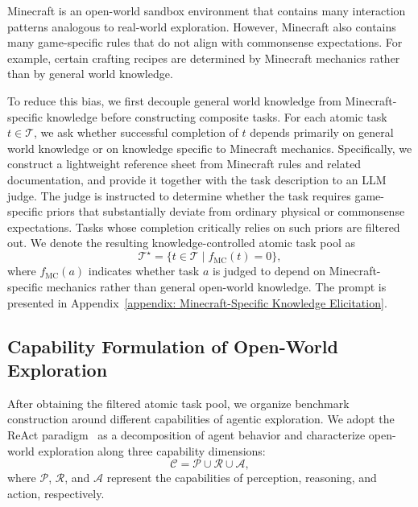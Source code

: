 \documentclass[11pt]{article}
\begin{document}
Minecraft is an open-world sandbox environment that contains many interaction patterns analogous to real-world exploration. 
However, Minecraft also contains many game-specific rules that do not align with commonsense expectations. 
For example, certain crafting recipes are determined by Minecraft mechanics rather than by general world knowledge.

To reduce this bias, we first decouple general world knowledge from Minecraft-specific knowledge before constructing composite tasks. 
For each atomic task $t \in \mathcal{T}$, we ask whether successful completion of $t$ depends primarily on general world knowledge or on knowledge specific to Minecraft mechanics. 
Specifically, we construct a lightweight reference sheet from Minecraft rules and related documentation, and provide it together with the task description to an LLM judge. 
The judge is instructed to determine whether the task requires game-specific priors that substantially deviate from ordinary physical or commonsense expectations. 
Tasks whose completion critically relies on such priors are filtered out. 
We denote the resulting knowledge-controlled atomic task pool as
\begin{equation}
    \mathcal{T}^{\star} = \{t \in \mathcal{T} \mid f_{\mathrm{MC}}(t) = 0\},
\end{equation}
where $f_{\mathrm{MC}}(a)$ indicates whether task $a$ is judged to depend on Minecraft-specific mechanics rather than general open-world knowledge. 
The prompt is presented in Appendix~\ref{appendix: Minecraft-Specific Knowledge Elicitation}.

\subsection{Capability Formulation of Open-World Exploration}
\label{sec: Capability Formulation of Open-World Exploration}

After obtaining the filtered atomic task pool, we organize benchmark construction around different capabilities of agentic exploration. 
We adopt the ReAct paradigm~\citep{ReAct} as a decomposition of agent behavior and characterize open-world exploration along three capability dimensions: 
\begin{equation}
    \mathcal{C}=\mathcal{P}\cup\mathcal{R}\cup\mathcal{A},
\end{equation}
where $\mathcal{P}$, $\mathcal{R}$, and $\mathcal{A}$ represent the capabilities of perception, reasoning, and action, respectively.
\end{document}
